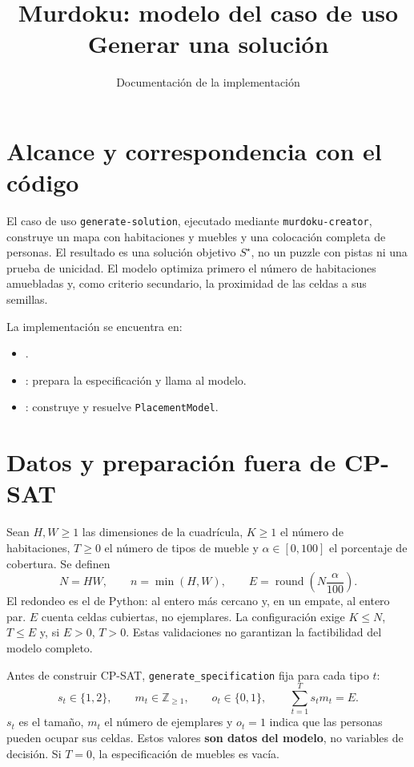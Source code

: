 \documentclass[11pt,a4paper]{article}
\title{Murdoku: modelo del caso de uso\\Generar una soluci\'on}
\author{Documentaci\'on de la implementaci\'on}
\date{}
\newcommand{\B}{\{0,1\}}
\begin{document}
\maketitle

\section{Alcance y correspondencia con el c\'odigo}

El caso de uso \texttt{generate-solution}, ejecutado mediante
\texttt{murdoku-creator}, construye un mapa con habitaciones y muebles y
una colocaci\'on completa de personas. El resultado es una soluci\'on
objetivo $S^\star$, no un puzzle con pistas ni una prueba de unicidad.
El modelo optimiza primero el n\'umero de habitaciones amuebladas y,
como criterio secundario, la proximidad de las celdas a sus semillas.

La implementaci\'on se encuentra en:
\begin{itemize}
  \item {}.
  \item {}:
        prepara la especificaci\'on y llama al modelo.
  \item {}:
        construye y resuelve \texttt{PlacementModel}.
\end{itemize}

\section{Datos y preparaci\'on fuera de CP-SAT}

Sean $H,W\geq 1$ las dimensiones de la cuadr\'icula, $K\geq 1$ el
n\'umero de habitaciones, $T\geq 0$ el n\'umero de tipos de mueble y
$\alpha\in[0,100]$ el porcentaje de cobertura. Se definen
\[
 N=HW,\qquad n=\min(H,W),\qquad
 E=\operatorname{round}\left(N\frac{\alpha}{100}\right).
\]
El redondeo es el de Python: al entero m\'as cercano y, en un empate,
al entero par. $E$ cuenta celdas cubiertas, no ejemplares.
La configuraci\'on exige $K\leq N$, $T\leq E$ y, si $E>0$, $T>0$.
Estas validaciones no garantizan la factibilidad del modelo completo.

Antes de construir CP-SAT, \texttt{generate\_specification} fija para
cada tipo $t$:
\[
 s_t\in\{1,2\},\qquad m_t\in\mathbb Z_{\geq 1},\qquad o_t\in\B,
 \qquad \sum_{t=1}^{T}s_tm_t=E.
\]
$s_t$ es el tama\~no, $m_t$ el n\'umero de ejemplares y $o_t=1$
indica que las personas pueden ocupar sus celdas. Estos valores
\textbf{son datos del modelo}, no variables de decisi\'on.
Si $T=0$, la especificaci\'on de muebles es vac\'ia.
\end{document}
